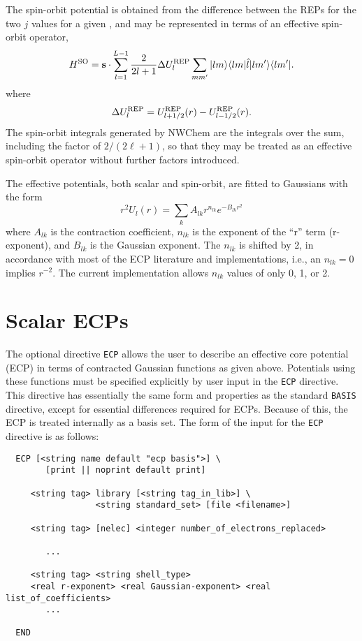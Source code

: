 The spin-orbit potential is obtained from the difference between the REPs
for the two $j$ values for a given \ell, and may be 
represented in terms of an effective spin-orbit operator,
\begin{equation}
H^{\rm SO} = {\bf s} \cdot \sum_{\ell=1}^{L-1} \frac{2}{2\ell+1} 
\Delta U^{\rm REP}_{\ell} \sum_{mm'} 
| \ell m \rangle \langle \ell m | \hat\ell | \ell m' \rangle \langle \ell m' |.
\end{equation}
where
\begin{equation}
\Delta U^{\rm REP}_{\ell} = U^{\rm REP}_{\ell+1/2}(r)
 - U^{\rm REP}_{\ell-1/2}(r).
\end{equation}
The spin-orbit integrals generated by NWChem are the integrals over the sum,
including the factor of $2/(2\ell+1)$, so that they may be treated as an
effective spin-orbit operator without further factors introduced.

The effective potentials, both scalar and spin-orbit, are fitted to
Gaussians with the form
\[
 r^2U_l(r) = \sum_{k} A_{lk} r^{n_{lk}} e^{-B_{lk}r^{2}}
\]
where $A_{lk}$ is the contraction coefficient, $n_{lk}$ is the
exponent of the ``r'' term (r-exponent), and $B_{lk}$ is the Gaussian
exponent.  The $n_{lk}$ is shifted by 2, in accordance with most of the ECP
literature and implementations, i.e., an $n_{lk} = 0$ implies
$r^{-2}$.  The current implementation allows $n_{lk}$ values
of only 0, 1, or 2. 

\section{Scalar ECPs}
\label{sec:scalar_ecp}

The optional directive \verb+ECP+ allows the user to describe an effective core
potential (ECP) in terms of contracted Gaussian functions as given above.
Potentials using these functions must be specified explicitly by user input
in the \verb+ECP+ directive.  This directive has essentially the same form
and properties as the standard \verb+BASIS+ directive, except for essential
differences required for ECPs.  Because of this, the ECP is treated
internally as a basis set. The form of the input for the
\verb+ECP+ directive is as follows:


\begin{verbatim}
  ECP [<string name default "ecp basis">] \
        [print || noprint default print]

     <string tag> library [<string tag_in_lib>] \
                  <string standard_set> [file <filename>]

     <string tag> [nelec] <integer number_of_electrons_replaced>
 
        ...

     <string tag> <string shell_type>
     <real r-exponent> <real Gaussian-exponent> <real list_of_coefficients>
        ...
     
  END
\end{verbatim}    

